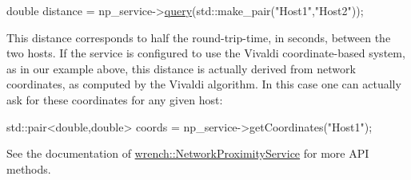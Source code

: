 \begin{DoxyCode}
\textcolor{keywordtype}{double} distance = np\_service->\hyperlink{classwrench_1_1_network_proximity_service_a3fe7aa39935af1eeeccdd18288f88068}{query}(std::make\_pair(\textcolor{stringliteral}{"Host1"},\textcolor{stringliteral}{"Host2"}));
\end{DoxyCode}


This distance corresponds to half the round-\/trip-\/time, in seconds, between the two hosts. If the service is configured to use the Vivaldi coordinate-\/based system, as in our example above, this distance is actually derived from network coordinates, as computed by the Vivaldi algorithm. In this case one can actually ask for these coordinates for any given host\+:


\begin{DoxyCode}
std::pair<double,double> coords = np\_service->getCoordinates(\textcolor{stringliteral}{"Host1"});
\end{DoxyCode}


See the documentation of {\ttfamily \hyperlink{classwrench_1_1_network_proximity_service}{wrench\+::\+Network\+Proximity\+Service}} for more A\+PI methods. 